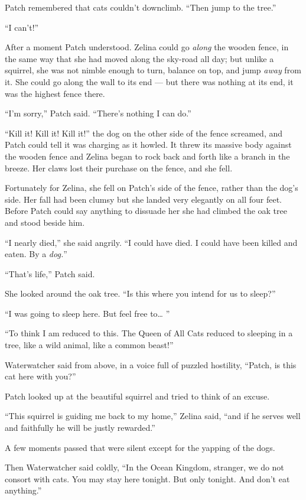 \documentclass[ebook,oneside,openany,17pt]{memoir}
\begin{document}
Patch remembered that cats couldn’t downclimb. “Then jump to the
tree.”

“I can’t!”

After a moment Patch understood. Zelina could go \emph{along} the
wooden fence, in the same way that she had moved along the sky-road
all day; but unlike a squirrel, she was not nimble enough to turn,
balance on top, and jump \emph{away} from it. She could go along the
wall to its end — but there was nothing at its end, it was the highest
fence there.

“I’m sorry,” Patch said. “There’s nothing I can do.”

“Kill it! Kill it! Kill it!” the dog on the other side of the fence
screamed, and Patch could tell it was charging as it howled. It threw
its massive body against the wooden fence and Zelina began to rock
back and forth like a branch in the breeze. Her claws lost their
purchase on the fence, and she fell.

Fortunately for Zelina, she fell on Patch’s side of the fence, rather
than the dog’s side. Her fall had been clumsy but she landed very
elegantly on all four feet. Before Patch could say anything to
dissuade her she had climbed the oak tree and stood beside him.

“I nearly died,” she said angrily. “I could have died. I could have
been killed and eaten. By a \emph{dog.}”

“That’s life,” Patch said.

She looked around the oak tree. “Is this where you intend for us to
sleep?”

“I was going to sleep here. But feel free to… ”

“To think I am reduced to this. The Queen of All Cats reduced to
sleeping in a tree, like a wild animal, like a common beast!”

Waterwatcher said from above, in a voice full of puzzled hostility,
“Patch, is this cat here with you?”

Patch looked up at the beautiful squirrel and tried to think of an
excuse.

“This squirrel is guiding me back to my home,” Zelina said, “and if he
serves well and faithfully he will be justly rewarded.”

A few moments passed that were silent except for the yapping of the
dogs.

Then Waterwatcher said coldly, “In the Ocean Kingdom, stranger, we do
not consort with cats. You may stay here tonight. But only
tonight. And don’t eat anything.”
\end{document}
